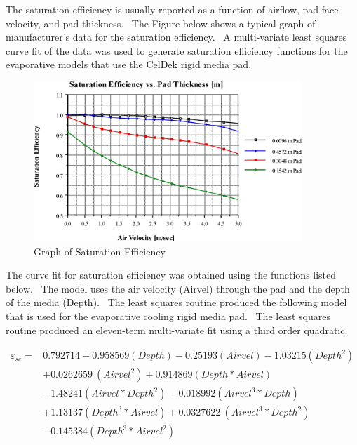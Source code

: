 The saturation efficiency is usually reported as a function of airflow, pad face velocity, and pad thickness.~ The Figure below shows a typical graph of manufacturer's data for the saturation efficiency.~ A multi-variate least squares curve fit of the data was used to generate saturation efficiency functions for the evaporative models that use the CelDek rigid media pad.

\begin{figure}[hbtp] %
\centering
\includegraphics[width=0.9\textwidth, height=0.9\textheight, keepaspectratio=true]{media/image4793.png}
\caption{Graph of Saturation Efficiency \protect \label{fig:graph-of-saturation-efficiency}}
\end{figure}

The curve fit for saturation efficiency was obtained using the functions listed below.~ The model uses the air velocity (Airvel) through the pad and the depth of the media (Depth).~ The least squares routine produced the following model that is used for the evaporative cooling rigid media pad.~ The least squares routine produced an eleven-term multi-variate fit using a third order quadratic.

\begin{equation}
\begin{array}{rl}
\varepsilon_{se} = & 0.792714 + 0.958569(Depth) - 0.25193(Airvel) - 1.03215(Depth^{2}) \\
 & + 0.0262659~(Airvel^{2}) + 0.914869 (Depth * Airvel) \\
 & - 1.48241 (Airvel * Depth^{2}) - 0.018992 (Airvel^{3} * Depth) \\
 & + 1.13137 (Depth^{3} * Airvel) + 0.0327622~(Airvel^{3} * Depth^{2}) \\
 & - 0.145384 (Depth^{3} * Airvel^{2})
\end{array}
\end{equation}

